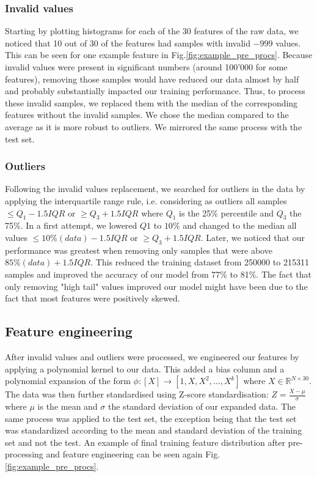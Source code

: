 \documentclass[10pt,conference,compsocconf]{IEEEtran}
\begin{document}
\subsubsection{Invalid values}\label{subsubsec:invalid_values}
Starting by plotting histograms for each of the 30 features of the raw data, we noticed that 10 out of 30 of the features had samples with invalid $-999$ values.   This can be
seen for one example feature in Fig.\ref{fig:example_pre_procs}. Because invalid values were present in significant numbers (around 100'000 for some features), removing those samples would have reduced our data almost by half and probably substantially impacted our training performance. Thus, to process these invalid samples, we replaced them with the median of the corresponding features without the invalid samples. We chose the median compared to the average as it is more robust to outliers. We mirrored the same process with the test set.
\subsubsection{Outliers}\label{subsubsec:outliers}
  Following the invalid values replacement, we searched for outliers in the data by applying the interquartile range rule, i.e. considering as outliers all samples $\leq Q_1-1.5IQR$ or $\geq Q_3+1.5IQR$ where $Q_1$ is the 25\% percentile and $Q_3$ the 75\%. In a first attempt, we lowered $Q1$ to $10\%$ and changed to the median all values $\leq 10\%(data)-1.5IQR$ or $\geq Q_3+1.5IQR$. Later, we noticed that our performance was greatest when removing only samples that were above  $85\%(data)+1.5IQR$. This reduced the training dataset from 250000 to 215311 samples and improved the accuracy of our model from 77\% to 81\%. The fact  that only removing "high tail" values improved our model might have been due to the fact that most features were positively skewed.  
  \subsection{Feature engineering}\label{subsec: feature_generation}
    After invalid values and outliers were processed, we engineered our features by applying a polynomial kernel to our data. This added a bias column and a polynomial expansion of the form $\phi:[X]\rightarrow [1, X, X^2,...,X^k]$ where $X\in \mathbb{R}^{N\times30}$. The data was then further standardised using Z-score standardisation: $Z = \frac{X - \mu}{\sigma}$ where $\mu$ is the mean and $\sigma$ the standard deviation of our expanded data. The same process was applied to the test set, the exception being that the test set was standardized according to the mean and standard deviation of the training set and not the test. An example of final training feature distribution after pre-processing and feature engineering can be seen again Fig.\ref{fig:example_pre_procs}.
    
\end{document}
